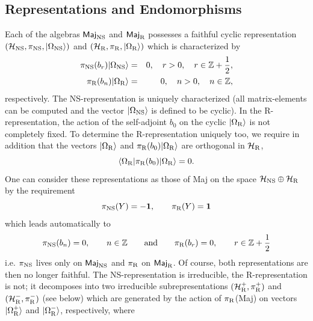 \documentclass[10pt,a4paper]{article}
\begin{document}
\subsection{Representations and Endomorphisms}
Each of the algebras $\mbox{\sf Maj}_{\rm NS}$ and
$\mbox{\sf Maj}_{\rm R}$ possesses a faithful cyclic
representation
$({\cal H}_{\rm NS},\pi_{\rm NS},|\Omega_{\rm NS}\rangle)$ and
$({\cal H}_{\rm R},\pi_{\rm R},|\Omega_{\rm R}\rangle)$ which is
characterized by
\begin{eqnarray}
\label{defNS}
\pi_{\rm NS} (b_r)|\Omega_{\rm NS}\rangle &=& 0, \quad r>0,
\quad r\in \mathbb{Z}+\frac{1}{2}, \\
\label{defR}
\pi_{\rm R} (b_n) |\Omega_{\rm R} \rangle&=& 0, \quad n>0,
\quad n\in \mathbb{Z},
\end{eqnarray}
respectively.
The NS-representation is uniquely characterized
(all matrix-ele\-ments can be computed and the vector
$|\Omega_{\rm NS}\rangle$ is defined to be cyclic).
In the R-representation, the action of the
self-adjoint $b_0$ on the cyclic $|\Omega_{\rm R}\rangle$
is not completely fixed. To determine the
R-representation uniquely too, we require in
addition that the vectors $|\Omega_{\rm R}\rangle$ and
$\pi_{\rm R}(b_0)|\Omega_{\rm R}\rangle$ are orthogonal in
${\cal H}_{\rm R}$,
\begin{equation}
\label{ortho}
\langle \Omega_{\rm R} | \pi_{\rm R} (b_0)
| \Omega_{\rm R} \rangle = 0.
\end{equation}
One can consider these representations as those of {\sf Maj}
on the space ${\cal H}_{\rm NS}\oplus{\cal H}_{\rm R}$ by the
requirement
\begin{equation}
\pi_{\rm NS}(Y)= -{\bf 1}, \qquad \pi_{\rm R} (Y) = {\bf 1}
\end{equation}
which leads automatically to
\begin{equation}
\label{def0}
\pi_{\rm NS}(b_n)=0,\qquad n\in \mathbb{Z} \qquad \mbox{and}
\qquad \pi_{\rm R}(b_r)=0,\qquad r\in \mathbb{Z}+\frac{1}{2}
\end{equation}
i.e. $\pi_{\rm NS}$ lives only on $\mbox{\sf Maj}_{\rm NS}$ and
$\pi_{\rm R}$ on $\mbox{\sf Maj}_{\rm R}$. Of course, both
representations are then no longer faithful.
The NS-representation is irreducible, the
R-representation is not; it decomposes into two
irreducible subrepresentations
$({\cal H}_{\rm R}^+,\pi_{\rm R}^+)$ and $({\cal H}_{\rm R}^-,\pi_{\rm R}^-)$
(see below) which are generated by the
action of $\pi_{\rm R}$({\sf Maj})
on vectors $|\Omega_{\rm R}^+\rangle$ and
$|\Omega_{\rm R}^-\rangle$, respectively, where
\end{document}
